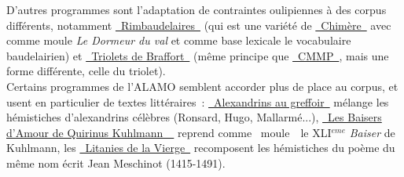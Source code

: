 \documentclass{article}
\begin{document}
					D'autres programmes sont l'adaptation de contraintes oulipiennes à des corpus différents, notamment \href{http://www.alamo.free.fr/pmwiki.php?n=Programmes.Rimbaudelaires}{\guillemotleft~Rimbaudelaires~\guillemotright} (qui est une variété de \href{http://oulipo.net/fr/contraintes/chimere}{\guillemotleft~Chimère~\guillemotright} avec comme moule \textit{Le Dormeur du val} et comme base lexicale le vocabulaire baudelairien) et \href{http://www.alamo.free.fr/pmwiki.php?n=Programmes.Triolets}{\guillemotleft~Triolets de Braffort~\guillemotright} (même principe que \href{http://oulipo.net/fr/contraintes/cmmp}{\guillemotleft~CMMP~\guillemotright}, mais une forme différente, celle du triolet).\\
					Certains programmes de l'ALAMO semblent accorder plus de place au corpus, et usent en particulier de textes littéraires~: \href{http://www.alamo.free.fr/pmwiki.php?n=Programmes.AlexandrinsAuGreffoir}{\guillemotleft~Alexandrins au greffoir~\guillemotright} mélange les hémistiches d'alexandrins célèbres (Ronsard, Hugo, Mallarmé...), \href{http://www.alamo.free.fr/pmwiki.php?n=Programmes.BaiserDeKuhlman}{\guillemotleft~Les Baisers d'Amour de Quirinus Kuhlmann~\guillemotright~} reprend comme \guillemotleft~moule~\guillemotright~le XLI$^{eme}$ \textit{Baiser} de Kuhlmann, les \href{http://www.alamo.free.fr/pmwiki.php?n=Programmes.LitaniesDeLaVierge}{\guillemotleft~Litanies de la Vierge~\guillemotright} recomposent les hémistiches du poème du même nom écrit Jean Meschinot (1415-1491).\\
					
\end{document}
